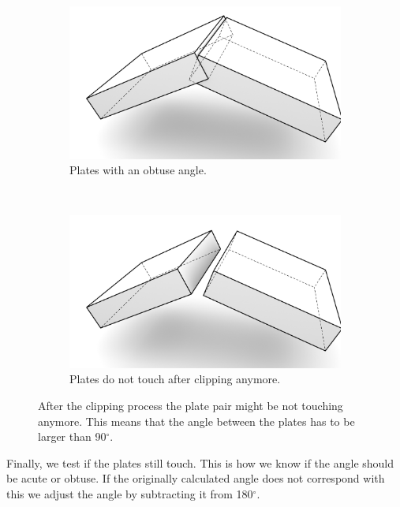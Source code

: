 \documentclass[../ClassicThesis.tex]{subfiles}
\begin{document}
\begin{figure}[!ht]
\begin{subfigure}[b]{0.45\textwidth}
\includegraphics[width=\columnwidth]{Images/Blocks_ovtuse_intersect.png}
\caption{Plates with an obtuse angle.}
\end{subfigure}
~
\begin{subfigure}[b]{0.45\textwidth}
\includegraphics[width=\columnwidth]{Images/Blocks_ovtuse_shortened.png}
\caption{Plates do not touch after clipping anymore.}
\end{subfigure}
\caption{After the clipping process the plate pair might be not touching anymore. This means that the angle between the plates has to be larger than 90$^\circ$.}
\label{fig:touchingOrNot}
\end{figure}

Finally, we test if the plates still touch. This is how we know if the angle should be acute or obtuse. If the originally calculated angle does not correspond with this we adjust the angle by subtracting it from 180$^\circ$.
\end{document}
